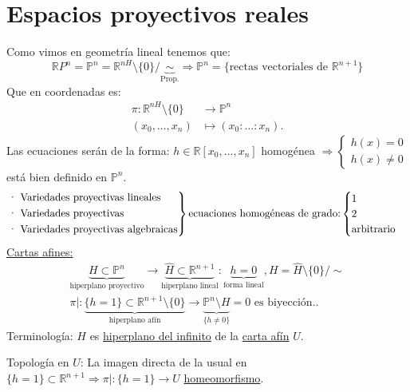 \section{Espacios proyectivos reales}%
\label{sec:espacios_proyectivos_reales}
Como vimos en geometría lineal tenemos que: 
\[
\mathbb{R}P^n = \mathbb{P}^{n} = \mathbb{R}^{nH}\setminus \{0\} / \underbrace{\sim }_{\text{Prop.}} \Rightarrow \mathbb{P}^{n} = \{\text{rectas vectoriales de } \mathbb{R}^{n+1}\}     
\]
Que en coordenadas es:
\begin{align*}
    \pi: \mathbb{R}^{nH} \setminus \{0\} &\rightarrow \mathbb{P}^{n}\\
    \left( x_0, \ldots, x_n \right) &\mapsto \left( x_0 : \ldots : x_n \right) 
.\end{align*}
Las ecuaciones serán de la forma: $h\in \mathbb{R}\left[ x_0, \ldots, x_n \right]$ homogénea $\Rightarrow \begin{cases}
    h\left( x \right) = 0\\
    h\left( x \right) \neq 0
\end{cases}$ está bien definido en $\mathbb{P}^{n}$.
\[
\begin{rcases}
   \text{· Variedades proyectivas lineales}\\  
   \text{· Variedades proyectivas}\\
   \text{· Variedades proyectivas algebraicas}  
\end{rcases} \text{ecuaciones homogéneas de grado:} 
\begin{cases}
    1\\
    2\\
    \text{arbitrario} 
\end{cases} 
\]
\underline{Cartas afines:} 
\begin{gather*}
    \underbrace{H \subset \mathbb{P}^{n}}_{\text{hiperplano proyectivo}} \rightarrow \underbrace{\hat{H} \subset \mathbb{R}^{n + 1}}_{\text{hiperplano lineal} } : \underbrace{h = 0}_{\text{forma lineal}}, H = \hat{H} \setminus \{0\} / \sim  \\
    \pi|: \underbrace{\{h = 1\} \subset \mathbb{R}^{n + 1} \setminus \{0\}}_{\text{hiperplano afín}} \rightarrow \underbrace{\mathbb{P}^{n} \setminus H}_{\{h \neq 0\}} = 0 \text{ es biyección.}    
.\end{gather*}
Terminología: $H$ es \underline{hiperplano del infinito} de la \underline{carta afín} $U$.

Topología en $U$: La imagen directa de la usual en $\{h = 1\} \subset \mathbb{R}^{n + 1} \Rightarrow \pi|: \{h = 1\} \rightarrow U$ \underline{homeomorfismo}. 


